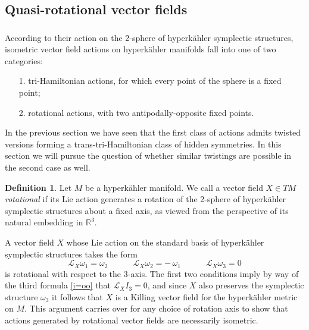 \documentclass[11pt]{amsart}
\theoremstyle{remark}
\theoremstyle{remark}
\theoremstyle{definition}
\newtheorem*{definition}{Definition}
\theoremstyle{definition}
\theoremstyle{definition}
\newcommand{\0}{{\scriptstyle 0'}} %
\newcommand{\1}{{\scriptstyle 1'}}
\begin{document}
\subsection{Quasi-rotational vector fields} 


\subsubsection{}


According to their action on the 2-sphere of hyperk\"ahler symplectic structures, isometric vector field actions on hyperk\"ahler manifolds fall into one of two categories: 
\begin{itemize}
\setlength{\itemsep}{2pt}
\item[1.] tri-Hamiltonian actions, for which every point of the sphere is a fixed point;
\item[2.] rotational actions, with two antipodally-opposite fixed points.
\end{itemize}
In the previous section we have seen that the first class of actions admits twisted versions forming a trans-tri-Hamiltonian class of hidden symmetries. In this section we will pursue the question of whether similar twistings are possible in the second case as well. 


\begin{definition}
Let $M$ be a hyperk\"ahler manifold. We call a vector field $X \in TM$ \textit{rotational} if its Lie action generates a rotation of the 2-sphere of hyperk\"ahler symplectic structures about a fixed axis, as viewed from the perspective of its natural embedding in $\mathbb{R}^3$.
\end{definition}

A vector field $X$ whose Lie action on the standard basis of hyperk\"ahler symplectic structures takes the form 
\begin{equation} \label{axial_rot}
\mathcal{L}_X \omega_1 = \omega_2
\qquad\quad
\mathcal{L}_X \omega_2 = - \, \omega_1
\qquad\quad
\mathcal{L}_X \omega_3 = 0
\end{equation}
is rotational with respect to the 3-axis. The first two conditions imply by way of the third formula \eqref{i=oo} that $\mathcal{L}_XI_3 = 0$, and since $X$ also preserves the symplectic structure $\omega_3$ it follows that $X$ is a Killing vector field for the hyperk\"ahler metric on $M$. This argument carries over for any choice of rotation axis to show that actions generated by rotational vector fields are necessarily isometric. 
\end{document}
